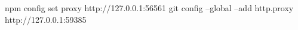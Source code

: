 npm config set proxy http://127.0.0.1:56561
git config --global --add http.proxy http://127.0.0.1:59385